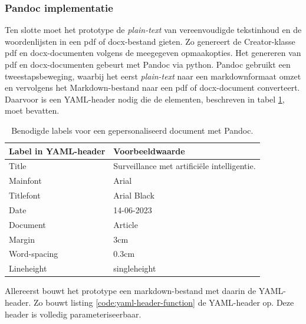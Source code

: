 \subsubsection{Pandoc implementatie}

Ten slotte moet het prototype de \textit{plain-text} van vereenvoudigde tekstinhoud en de woordenlijsten in een pdf of docx-bestand gieten. Zo genereert de Creator-klasse pdf en docx-documenten volgens de meegegeven opmaakopties. Het genereren van pdf en docx-documenten gebeurt met Pandoc via python.  Pandoc gebruikt een tweestapsbeweging, waarbij het eerst \textit{plain-text} naar een markdownformaat omzet en vervolgens het Markdown-bestand naar een pdf of docx-document converteert. Daarvoor is een YAML-header nodig die de elementen, beschreven in tabel \ref{table:personalized-pdf-word-document-with-pandoc}, moet bevatten.

\begin{table}[H]
	\begin{tabular}{ | m{5cm}| m{10cm} | }
		\hline
		\textbf{Label in YAML-header} & \textbf{Voorbeeldwaarde} \\ \hline
		Title & Surveillance met artificiële intelligentie. \\ \hline
		Mainfont & Arial \\ \hline 
		Titlefont & Arial Black \\ \hline
		Date & 14-06-2023 \\ \hline 
		Document & Article \\ \hline
		Margin & 3cm \\ \hline
		Word-spacing & 0.3cm \\ \hline 
		Lineheight & singleheight \\ \hline
	\end{tabular}
	\caption{Benodigde labels voor een gepersonaliseerd document met Pandoc.}
	\label{table:personalized-pdf-word-document-with-pandoc}
\end{table}

Allereerst bouwt het prototype een markdown-bestand met daarin de YAML-header. Zo bouwt listing \ref{code:yaml-header-function} de YAML-header op. Deze header is volledig parameteriseerbaar.

